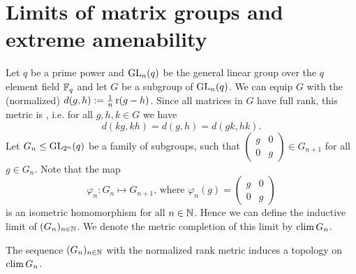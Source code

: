 






\section{Limits of matrix groups and extreme amenability}\label{sec:generalDefns}
Let $q$ be a prime power and $\operatorname{GL}_n(q)$ be the general linear group over the $q$ element field $\mathbb{F}_q$ and let $G$ be a subgroup of $\operatorname{GL}_n(q)$. We can equip $G$ with the (normalized)  $d(g,h):=\frac{1}{n}\operatorname{r}(g-h)$.
Since all matrices in $G$ have full rank, this metric is , i.e. for all $g,h,k\in G$ we have \[d(kg,kh)=d(g,h)=d(gk,hk).\] 
Let $G_n\leq \operatorname{GL}_{2^n}(q)$ be a family of subgroups, such that 
$\begin{pmatrix}
g &0\\
0&g
\end{pmatrix}\in G_{n+1}$ for all $g\in G_n$. Note that the map
\[\varphi_n\colon G_n\mapsto G_{n+1}\text{, where }\varphi_n(g)=\begin{pmatrix}
g &0\\
0&g
\end{pmatrix}\]
is an isometric homomorphism for all $n\in\mathbb{N}$. Hence we can define the inductive limit of $(G_n)_{n\in\mathbb{N}}$. We denote the metric completion of this limit by $\operatorname{clim} G_n$.%




\begin{lemma}\label{lem:GroupTopo}
The sequence $(G_n)_{n\in\mathbb{N}}$ with the normalized rank metric induces a topology on $\operatorname{clim} G_n$.
\end{lemma}

